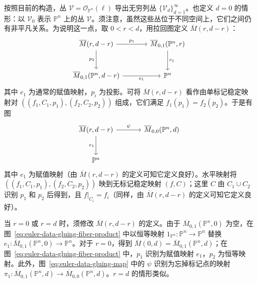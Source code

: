按照目前的构造，丛 $\mathcal V=\mathcal O_{\mathbb P^n}(\ell)$ 导出无穷列丛 $\{\mathcal V_d\}_{d=1}^{\infty}$。也定义 $d=0$ 的情形：以 $\mathcal V_0$ 表示 $\mathbb P^n$ 上的丛 $\mathcal V$。须注意，虽然这些丛位于不同空间上，它们之间仍有非平凡关系。为说明这一点，取 $0<r<d$，用拉回图定义 $\overline M(r,d-r)$：
\begin{equation}\label{eq:euler-data-gluing-fiber-product}
\begin{tikzcd}[column sep=large,row sep=large]
\overline M(r,d-r)\arrow[r,"p_1"]\arrow[d,"p_2"']&\overline M_{0,1}(\mathbb P^n,r)\arrow[d,"e_1"]\\
\overline M_{0,1}(\mathbb P^n,d-r)\arrow[r,"e_1"']&\mathbb P^n
\end{tikzcd}
\end{equation}
其中 $e_1$ 为通常的赋值映射，$p_i$ 为投影。可将 $\overline M(r,d-r)$ 看作由单标记稳定映射对 $((f_1,C_1,p_1),\allowbreak(f_2,C_2,p_2))$ 组成，它们满足 $f_1(p_1)=f_2(p_2)$。于是有图
\begin{equation}\label{eq:euler-data-gluing-map}
\begin{tikzcd}[column sep=large,row sep=large]
\overline M(r,d-r)\arrow[r,"\psi"]\arrow[d,"e_1"']&\overline M_{0,0}(\mathbb P^n,d)\\
\mathbb P^n&
\end{tikzcd}
\end{equation}
其中 $e_1$ 为赋值映射（由 $\overline M(r,d-r)$ 的定义可知它定义良好）。水平映射将 $((f_1,C_1,p_1),\allowbreak(f_2,C_2,p_2))$ 映到无标记稳定映射 $(f,C)$；这里 $C$ 由 $C_1\cup C_2$ 识别 $p_1$ 和 $p_2$ 后得到，且 $f|_{C_i}=f_i$（同样，由 $\overline M(r,d-r)$ 的定义可知它定义良好）。

当 $r=0$ 或 $r=d$ 时，须修改 $\overline M(r,d-r)$ 的定义。由于 $\overline M_{0,1}(\mathbb P^n,0)$ 为空，在图~\eqref{eq:euler-data-gluing-fiber-product} 中以恒等映射 $1_{\mathbb P^n}:\mathbb P^n\to\mathbb P^n$ 替换 $e_1:\overline M_{0,1}(\mathbb P^n,0)\to\mathbb P^n$。对于 $r=0$，得到 $\overline M(0,d)=\overline M_{0,1}(\mathbb P^n,d)$；在图~\eqref{eq:euler-data-gluing-fiber-product} 中，$p_1$ 识别为赋值映射 $e_1$，$p_2$ 为恒等映射。此外，图~\eqref{eq:euler-data-gluing-map} 中的 $\psi$ 识别为忘掉标记点的映射 $\pi_1:\overline M_{0,1}(\mathbb P^n,d)\to\overline M_{0,0}(\mathbb P^n,d)$。$r=d$ 的情形类似。


